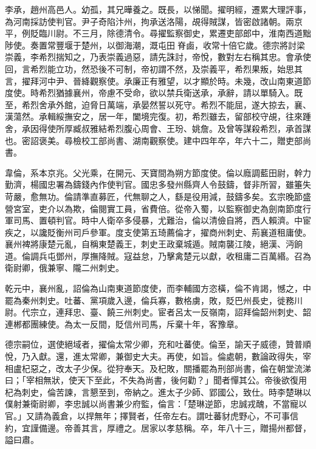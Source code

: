 \begin{pinyinscope}
 李承，趙州高邑人。幼孤，其兄曄養之。既長，以悌聞。擢明經，遷累大理評事，為河南採訪使判官。尹子奇陷汴州，拘承送洛陽，覘得賊謀，皆密啟諸朝。兩京平，例貶臨川尉。不三月，除德清令。尋擢監察御史，累遷吏部郎中，淮南西道黜陟使。奏置常豐堰于楚州，以御海潮，溉屯田脊鹵，收常十倍它歲。德宗將討梁崇義，李希烈揣知之，乃表崇義過惡，請先誅討，帝悅，數對左右稱其忠。會承使回，言希烈能立功，然恐後不可制，帝初謂不然，及崇義平，希烈果叛，始思其言，擢拜河中尹、晉絳觀察使。承廉正有雅望，以才顯於時。未幾，改山南東道節度使。時希烈猶據襄州，帝慮不受命，欲以禁兵衛送承，承辭，請以單騎入。既至，希烈舍承外館，迫脅日萬端，承晏然誓以死守。希烈不能屈，遂大掠去，襄、漢蕩然。承輯綏撫安之，居一年，闔境完復。初，希烈雖去，留部校守覘，往來踵舍，承因得使所厚臧叔雅結希烈腹心周會、王玢、姚詹。及曾等謀殺希烈，承首謀也。密詔褒美。尋檢校工部尚書、湖南觀察使。建中四年卒，年六十二，贈吏部尚書。



 韋倫，系本京兆。父光乘，在開元、天寶間為朔方節度使。倫以廕調藍田尉，幹力勤濟，楊國忠署為鑄錢內作使判官。國忠多發州縣齊人令鼓鑄，督非所習，雖箠失苛嚴，愈無功。倫請準直募匠，代無聊之人，繇是役用減，鼓鑄多矣。玄宗晚節盛營宮室，吏介以為欺，倫閱實工員，省費倍。從帝入蜀，以監察御史為劍南節度行軍司馬、置頓判官。時中人衛卒多侵暴，尤難治，倫以清儉自將，西人賴濟。中宦疾之，以讒貶衡州司戶參軍。度支使第五琦薦倫才，擢商州刺史、荊襄道租庸使。襄州裨將康楚元亂，自稱東楚義王，刺史王政棄城遁。賊南襲江陵，絕漢、沔餉道。倫調兵屯鄧州，厚撫降賊。寇益怠，乃擊禽楚元以獻，收租庸二百萬緡。召為衛尉卿，俄兼寧、隴二州刺史。



 乾元中，襄州亂，詔倫為山南東道節度使，而李輔國方恣橫，倫不肯謁，憾之，中罷為秦州刺史。吐蕃、黨項歲入邊，倫兵寡，數格虜，敗，貶巴州長史，徙務川尉。代宗立，連拜忠、臺、饒三州刺史。宦者呂太一反嶺南，詔拜倫韶州刺史、韶連郴都團練使。為太一反間，貶信州司馬，斥棄十年，客豫章。



 德宗嗣位，選使絕域者，擢倫太常少卿，充和吐蕃使。倫至，諭天子威德，贊普順悅，乃入獻。還，進太常卿，兼御史大夫。再使，如旨。倫處朝，數論政得失，宰相盧杞惡之，改太子少保。從狩奉天。及杞敗，關播罷為刑部尚書，倫在朝堂流涕曰；「宰相無狀，使天下至此，不失為尚書，後何勸？」聞者憚其公。帝後欲復用杞為刺史，倫苦諫，言懇至到，帝納之。進太子少師、郢國公，致仕。時李楚琳以僕射兼衛尉卿，李忠誠以尚書兼少府監，倫言：「楚琳逆節，忠誠戎醜，不當寵以官。」又請為義倉，以捍無年；擇賢者，任帝左右。謂吐蕃豺虎野心，不可事信約，宜謹備邊。帝善其言，厚禮之。居家以孝慈稱。卒，年八十三，贈揚州都督，謚曰肅。




\end{pinyinscope}
